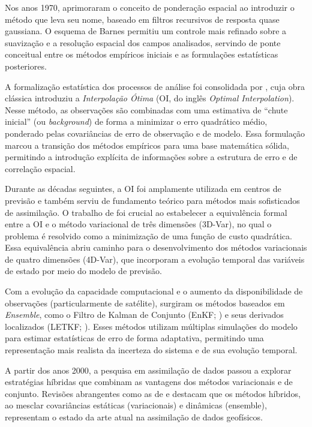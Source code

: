 Nos anos 1970, \cite{Barnes1964, Barnes1973} aprimoraram o conceito de ponderação espacial ao introduzir o método que leva seu nome, baseado em filtros recursivos de resposta quase gaussiana. O esquema de Barnes permitiu um controle mais refinado sobre a suavização e a resolução espacial dos campos analisados, servindo de ponte conceitual entre os métodos empíricos iniciais e as formulações estatísticas posteriores.

A formalização estatística dos processos de análise foi consolidada por \cite{Gandin1963}, cuja obra clássica introduziu a \textit{Interpolação Ótima} (OI, do inglês \textit{Optimal Interpolation}). Nesse método, as observações são combinadas com uma estimativa de ``chute inicial'' (ou \textit{background}) de forma a minimizar o erro quadrático médio, ponderado pelas covariâncias de erro de observação e de modelo. Essa formulação marcou a transição dos métodos empíricos para uma base matemática sólida, permitindo a introdução explícita de informações sobre a estrutura de erro e de correlação espacial.

Durante as décadas seguintes, a OI foi amplamente utilizada em centros de previsão e também serviu de fundamento teórico para métodos mais sofisticados de assimilação. O trabalho de \cite{Lorenc1986} foi crucial ao estabelecer a equivalência formal entre a OI e o método variacional de três dimensões (3D-Var), no qual o problema é resolvido como a minimização de uma função de custo quadrática. Essa equivalência abriu caminho para o desenvolvimento dos métodos variacionais de quatro dimensões (4D-Var), que incorporam a evolução temporal das variáveis de estado por meio do modelo de previsão.

Com a evolução da capacidade computacional e o aumento da disponibilidade de observações (particularmente de satélite), surgiram os métodos baseados em \textit{Ensemble}, como o Filtro de Kalman de Conjunto (EnKF; \cite{Evensen2009}) e seus derivados localizados (LETKF; \cite{Hunt2007}). Esses métodos utilizam múltiplas simulações do modelo para estimar estatísticas de erro de forma adaptativa, permitindo uma representação mais realista da incerteza do sistema e de sua evolução temporal.

A partir dos anos 2000, a pesquisa em assimilação de dados passou a explorar estratégias híbridas que combinam as vantagens dos métodos variacionais e de conjunto. Revisões abrangentes como as de \cite{Bannister2017} e \cite{Carrassi2018} destacam que os métodos híbridos, ao mesclar covariâncias estáticas (variacionais) e dinâmicas (ensemble), representam o estado da arte atual na assimilação de dados geofísicos.

